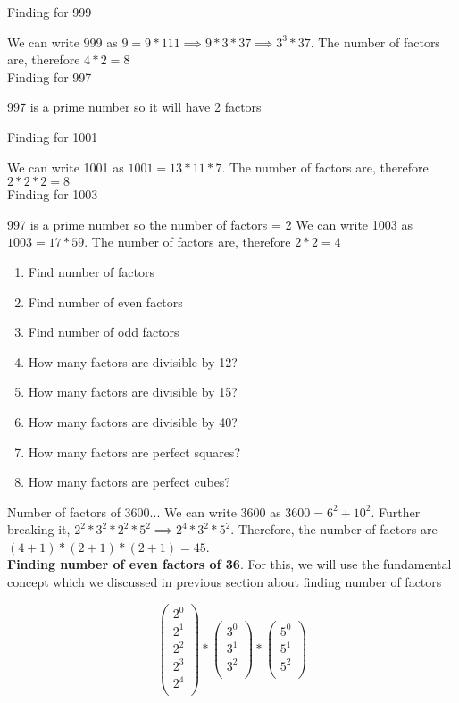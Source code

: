 Finding for 999

We can write 999 as $9 = 9 * 111 \implies 9 * 3 * 37 \implies 3^3 * 37$. The  number of factors are, therefore $4 * 2 = 8$ \\

Finding for 997 

997 is a prime number so it will have 2 factors 

Finding for 1001

We can write 1001 as $1001 = 13 * 11 * 7$. The  number of factors are, therefore $2 * 2 * 2 = 8$ \\

Finding for 1003

997 is a prime number so the number of factors = 2
We can write 1003 as $1003 = 17 * 59$. The  number of factors are, therefore $2 * 2 = 4$ \\


\begin{enumerate}
    \item Find number of factors
    \item Find number of even factors
    \item Find number of odd factors
    \item How many factors are divisible by 12?
    \item How many factors are divisible by 15?
    \item How many factors are divisible by 40?
    \item How many factors are perfect squares?
    \item How many factors are perfect cubes?
\end{enumerate}

Number of factors of 3600... We can write 3600 as $3600 = 6^2 + 10^2$. Further breaking it, $2^2 * 3^2 * 2^2 * 5^2 \implies 2^4 * 3^2 * 5^2$. Therefore, the number of factors are $(4+1) * (2+1) * (2+1) = 45$. \\

\textbf{Finding number of even factors of 36}. For this, we will use the fundamental concept which we discussed in previous section about finding number of factors

$$
\begin{pmatrix}
    2^0 \\
    2^1 \\
    2^2 \\
    2^3 \\
    2^4 \\
\end{pmatrix}
*
\begin{pmatrix}
    3^0 \\
    3^1 \\
    3^2 \\
\end{pmatrix}
*
\begin{pmatrix}
    5^0 \\
    5^1 \\
    5^2 \\
\end{pmatrix}
$$

